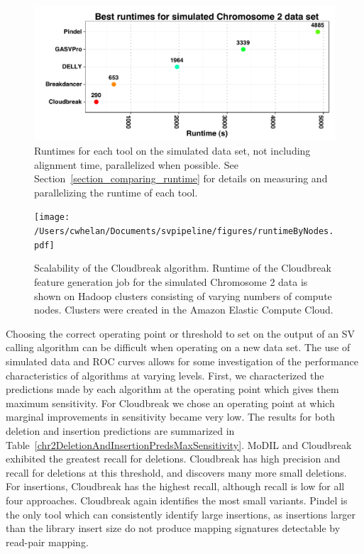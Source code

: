 \begin{figure}
\centering
\includegraphics[width=1\textwidth]{figures/chr2BestRuntimes_horizontal.pdf}
\caption{Runtimes for each tool on the simulated data set, not including alignment time, parallelized when possible. See Section~\ref{section_comparing_runtime} for details on measuring and parallelizing the runtime of each tool.}
\label{chr2BestRuntimes}
\end{figure}

\begin{figure}
\centering
\texttt{[image: /Users/cwhelan/Documents/svpipeline/figures/runtimeByNodes.pdf]}
\caption{Scalability of the Cloudbreak algorithm. Runtime of the Cloudbreak feature generation job for the simulated Chromosome 2 data is shown on Hadoop clusters consisting of varying numbers of compute nodes. Clusters were created in the Amazon Elastic Compute Cloud.}
\label{scalability}
\end{figure}

Choosing the correct operating point or threshold to set on the output of an SV calling algorithm can be difficult when operating on a new data set. The use of simulated data and ROC curves allows for some investigation of the performance characteristics of algorithms at varying levels. First, we characterized the predictions made by each algorithm at the operating point which gives them maximum sensitivity. For Cloudbreak we chose an operating point at which marginal improvements in sensitivity became very low. The results for both deletion and insertion predictions are summarized in Table~\ref{chr2DeletionAndInsertionPredsMaxSensitivity}. MoDIL and Cloudbreak exhibited the greatest recall for deletions. Cloudbreak has high precision and recall for deletions at this threshold, and discovers many more small deletions. For insertions, Cloudbreak has the highest recall, although recall is low for all four approaches. Cloudbreak again identifies the most small variants. Pindel is the only tool which can consistently identify large insertions, as insertions larger than the library insert size do not produce mapping signatures detectable by read-pair mapping. 

